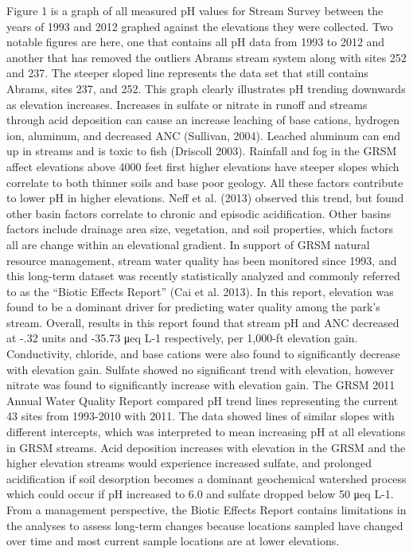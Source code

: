Figure 1 is a graph of all measured pH values for Stream Survey between the years of 1993 and 2012 graphed against the elevations they were collected.  Two notable figures are here, one that contains all pH data from 1993 to 2012 and another that has removed the outliers Abrams stream system along with sites 252 and 237.  The steeper sloped line represents the data set that still contains Abrams, sites 237, and 252.  This graph clearly illustrates pH trending downwards as elevation increases.  Increases in sulfate or nitrate in runoff and streams through acid deposition can cause an increase leaching of base cations, hydrogen ion, aluminum, and decreased ANC (Sullivan, 2004).  Leached aluminum can end up in streams and is toxic to fish (Driscoll 2003).  Rainfall and fog in the GRSM affect elevations above 4000 feet first higher elevations have steeper slopes which correlate to both thinner soils and base poor geology.  All these factors contribute to lower pH in higher elevations.  Neff et al. (2013) observed this trend, but found other basin factors correlate to chronic and episodic acidification.  Other basins factors include drainage area size, vegetation, and soil properties, which factors all are change within an elevational gradient.  
In support of GRSM natural resource management, stream water quality has been monitored since 1993, and this long-term dataset was recently statistically analyzed and commonly referred to as the “Biotic Effects Report” (Cai et al. 2013).  In this report, elevation was found to be a dominant driver for predicting water quality among the park’s stream.  Overall, results in this report found that stream pH and ANC decreased at -.32 units and -35.73 μeq L-1 respectively, per 1,000-ft elevation gain.  Conductivity, chloride, and base cations were also found to significantly decrease with elevation gain.  Sulfate showed no significant trend with elevation, however nitrate was found to significantly increase with elevation gain.  The GRSM 2011 Annual Water Quality Report compared pH trend lines representing the current 43 sites from 1993-2010 with 2011.  The data showed lines of similar slopes with different intercepts, which was interpreted to mean increasing pH at all elevations in GRSM streams.  Acid deposition increases with elevation in the GRSM and the higher elevation streams would experience increased sulfate, and prolonged acidification if soil desorption becomes a dominant geochemical watershed process which could occur if pH increased to 6.0 and sulfate dropped below 50 μeq L-1.  From a management perspective, the Biotic Effects Report contains limitations in the analyses to assess long-term changes because locations sampled have changed over time and most current sample locations are at lower elevations.

